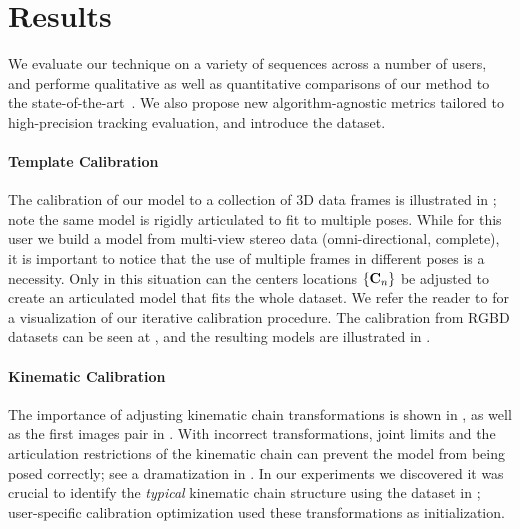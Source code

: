 
\section{Results}
\label{sec:results}
We evaluate our technique on a variety of sequences across a number of users, and performe qualitative as well as quantitative comparisons of our method to the state-of-the-art~\cite{qian2014realtime,sridhar2015fast,tagliasacchi2015robust,sharp2015accurate,taylor2016concerto}. We also propose new algorithm-agnostic metrics tailored to high-precision tracking evaluation, and introduce the \handy{} dataset.

\paragraph{Template Calibration}
The calibration of our model to a collection of 3D data frames is illustrated in ; note the same model is rigidly articulated to fit to multiple poses. While for this user we build a model from multi-view stereo data (omni-directional, complete), it is important to notice that the use of multiple frames in different poses is a necessity. Only in this situation can the centers locations ${\{\mathbf{C}_n\}}$ be  adjusted to create an articulated model that  fits the whole dataset. We refer the reader to \VideoMVS{} for a visualization of our iterative calibration procedure. The calibration from RGBD datasets can be seen at \VideoCalibRGB{}, and the resulting models are illustrated in . 

\paragraph{Kinematic Calibration}
The importance of adjusting kinematic chain transformations is shown in , as well as the first images pair in . With incorrect  transformations, joint limits and the articulation restrictions of the kinematic chain can prevent the model from being posed correctly; see a dramatization in \VideoKinematic{}. In our experiments we discovered it was crucial to identify the \emph{typical} kinematic chain structure using the dataset in ; user-specific calibration optimization used these transformations as initialization.

\newpage

